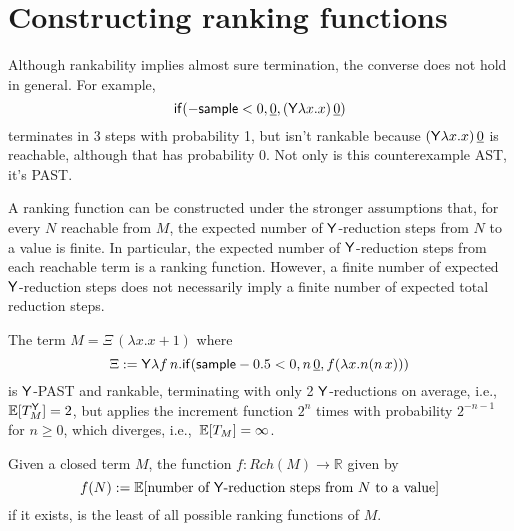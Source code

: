 \section{Constructing ranking functions}
\label{sec:ranking}

Although rankability implies almost sure termination, the converse does not hold in general. For example,
\begin{equation*}
\tif{{-}\tsample < 0}{\underline{0}}{(\tY \lambda x. x) \, \underline 0}
\label{ex:0 probability reachable}
\end{equation*}
terminates in 3 steps with probability 1, but isn't rankable because $(\mathsf{Y} \lambda x. x) \, \underline 0$ is reachable, although that has probability 0. 
Not only is this counterexample AST, it's PAST. %

A ranking function can be constructed under the stronger assumptions that, for every $N$ reachable from $M$, the expected number of $\mathsf{Y}$-reduction steps from $N$ to a value is finite. 
In particular, the expected number of $\mathsf{Y}$-reduction steps from each reachable term is a ranking function. 
However, a finite number of expected $\mathsf{Y}$-reduction steps does not necessarily imply a finite number of expected total reduction steps.

\begin{example}
\label{ex:tY finite does not imply t finite}
The term $M = \Xi \, (\lambda x. x+1)$ where
\[
\Xi := \mathsf{Y} \lambda f \, n. \mathsf{if}(\mathsf{sample} - 0.5 < 0, n \, \underline 0, f (\lambda x. n (n \, x)))
\] 
is $\mathsf{Y}$-PAST and rankable, terminating with only 2 $\mathsf{Y}$-reductions on average, i.e.,~$\mathbb{E}[T_M^{\mathsf{Y}}] = 2$, but applies the increment function $2^n$ times with probability $2^{-n-1}$ for $n \geq 0$, which diverges, i.e.,~$\mathbb{E}[T_M] = \infty$.
\end{example}

\begin{therm}
\label{thm:minimal}
Given a closed term $M$, the function $f:Rch(M) \to \mathbb R$ given by 
\[
f(N) := \mathbb E [\text{number of }\mathsf{Y}\text{-reduction steps from }N\text{ to a value}]
\] 
if it exists, is the least of all possible ranking functions of $M$.
\end{therm}

